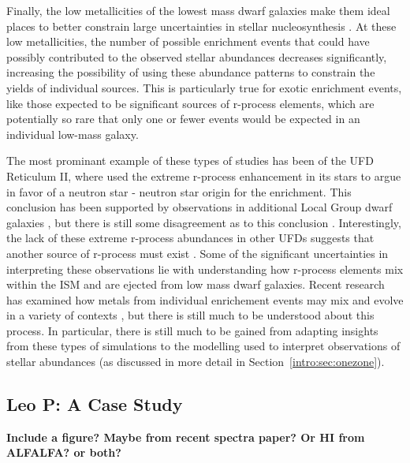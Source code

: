 Finally, the low metallicities of the lowest mass dwarf galaxies make them ideal places to better constrain large uncertainties in stellar nucleosynthesis \citep{FrebelNorris2015,Frebel2018}. At these low metallicities, the number of possible enrichment events that could have possibly contributed to the observed stellar abundances decreases significantly, increasing the possibility of using these abundance patterns to constrain the yields of individual sources. This is particularly true for exotic enrichment events, like those expected to be significant sources of r-process elements, which are potentially so rare that only one or fewer events would be expected in an individual low-mass galaxy. 

The most prominant example of these types of studies has been of the UFD Reticulum II, where \cite{Ji2016} used the extreme r-process enhancement in its stars to argue in favor of a neutron star -  neutron star origin for the enrichment. This conclusion has been supported by observations in additional Local Group dwarf galaxies \citep{Duggan2018}, but there is still some disagreement as to this conclusion \citep[e.g.][]{Siegel2018}. Interestingly, the lack of these extreme r-process abundances in other UFDs suggests that another source of r-process must exist \citep{Ji2016b}. Some of the significant uncertainties in interpreting these observations lie with understanding how r-process elements mix within the ISM and are ejected from low mass dwarf galaxies. Recent research has examined how metals from individual enrichement events may mix and evolve in a variety of contexts \citep[e.g.][]{Bland-Hawthorn2015,Ritter2015,Montes2016,Safarzadeh2017}, but there is still much to be understood about this process. In particular, there is still much to be gained from adapting insights from these types of simulations to the modelling used to interpret observations of stellar abundances (as discussed in more detail in Section~\ref{intro:sec:onezone}). 

\subsection{Leo P: A Case Study}

\textbf{Include a figure? Maybe from recent spectra paper? Or HI from ALFALFA? or both?}

